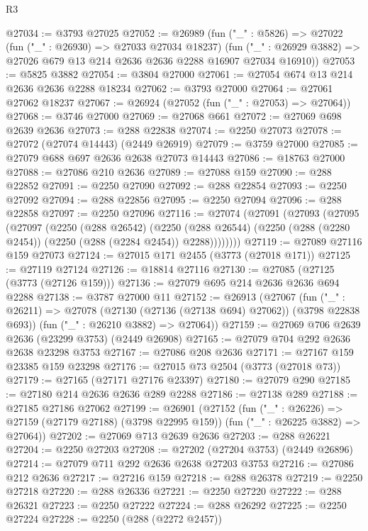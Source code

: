 \begin{lexlean}{R3}
\begin{coremodule}
@27034 := @3793 @27025
@27052 := @26989
    (fun ("_" : @5826) =>
    @27022
      (fun ("_" : @26930) => @27033 @27034 @18237)
      (fun ("_" : @26929 @3882) => @27026 @679 @13 @214 @2636 @2636 @2288 @16907 @27034 @16910))
@27053 := @5825 @3882
@27054 := @3804 @27000
@27061 := @27054 @674 @13 @214 @2636 @2636 @2288 @18234
@27062 := @3793 @27000
@27064 := @27061 @27062 @18237
@27067 := @26924 (@27052 (fun ("_" : @27053) => @27064))
@27068 := @3746 @27000
@27069 := @27068 @661
@27072 := @27069 @698 @2639 @2636
@27073 := @288 @22838
@27074 := @2250 @27073
@27078 := @27072 (@27074 @14443) (@2449 @26919)
@27079 := @3759 @27000
@27085 := @27079 @688 @697 @2636 @2638 @27073 @14443
@27086 := @18763 @27000
@27088 := @27086 @210 @2636
@27089 := @27088 @159
@27090 := @288 @22852
@27091 := @2250 @27090
@27092 := @288 @22854
@27093 := @2250 @27092
@27094 := @288 @22856
@27095 := @2250 @27094
@27096 := @288 @22858
@27097 := @2250 @27096
@27116 := @27074
    (@27091
      (@27093
        (@27095
          (@27097
            (@2250
              (@288 @26542)
              (@2250
                (@288 @26544)
                (@2250 (@288 (@2280 @2454)) (@2250 (@288 (@2284 @2454)) @2288))))))))
@27119 := @27089 @27116 @159 @27073
@27124 := @27015 @171 @2455 (@3773 (@27018 @171))
@27125 := @27119 @27124
@27126 := @18814 @27116
@27130 := @27085 (@27125 (@3773 (@27126 @159)))
@27136 := @27079 @695 @214 @2636 @2636 @694 @2288
@27138 := @3787 @27000 @11
@27152 := @26913
    (@27067
      (fun ("_" : @26211) => @27078 (@27130 (@27136 (@27138 @694) @27062)) (@3798 @22838 @693))
      (fun ("_" : @26210 @3882) => @27064))
@27159 := @27069 @706 @2639 @2636 (@23299 @3753) (@2449 @26908)
@27165 := @27079 @704 @292 @2636 @2638 @23298 @3753
@27167 := @27086 @208 @2636
@27171 := @27167 @159 @23385 @159 @23298
@27176 := @27015 @73 @2504 (@3773 (@27018 @73))
@27179 := @27165 (@27171 @27176 @23397)
@27180 := @27079 @290
@27185 := @27180 @214 @2636 @2636 @289 @2288
@27186 := @27138 @289
@27188 := @27185 @27186 @27062
@27199 := @26901
    (@27152
      (fun ("_" : @26226) => @27159 (@27179 @27188) (@3798 @22995 @159))
      (fun ("_" : @26225 @3882) => @27064))
@27202 := @27069 @713 @2639 @2636
@27203 := @288 @26221
@27204 := @2250 @27203
@27208 := @27202 (@27204 @3753) (@2449 @26896)
@27214 := @27079 @711 @292 @2636 @2638 @27203 @3753
@27216 := @27086 @212 @2636
@27217 := @27216 @159
@27218 := @288 @26378
@27219 := @2250 @27218
@27220 := @288 @26336
@27221 := @2250 @27220
@27222 := @288 @26321
@27223 := @2250 @27222
@27224 := @288 @26292
@27225 := @2250 @27224
@27228 := @2250 (@288 (@2272 @2457))

\end{coremodule}
\end{lexlean}
